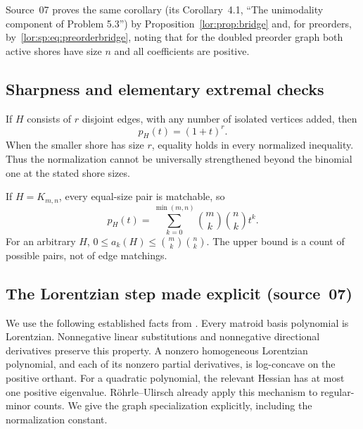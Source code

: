 \documentclass[11pt]{article}
\numberwithin{equation}{section}
\theoremstyle{definition}
\begin{document}
Source~07 proves the same corollary (its Corollary~4.1, ``The unimodality
component of Problem 5.3'') by Proposition~\ref{lor:prop:bridge} and, for
preorders, by~\eqref{lor:sp:eq:preorderbridge}, noting that for the doubled
preorder graph both active shores have size $n$ and all coefficients are
positive.
\subsection{Sharpness and elementary extremal checks}
If $H$ consists of $r$ disjoint edges, with any number of isolated vertices
added, then
\[
 p_H(t)=(1+t)^r.
\]
When the smaller shore has size $r$, equality holds in every normalized
inequality. Thus the normalization cannot be universally strengthened
beyond the binomial one at the stated shore sizes.

If $H=K_{m,n}$, every equal-size pair is matchable, so
\begin{equation}
 p_H(t)=\sum_{k=0}^{\min(m,n)}\binom m k\binom n k t^k.
 \label{lor:eq:completebip}
\end{equation}
For an arbitrary $H$,
$0\le a_k(H)\le\binom m k\binom n k$. The upper bound is a count of
possible pairs, not of edge matchings.


\subsection{The Lorentzian step made explicit (source~07)}
\label{lor:sec:sp:ulc}
We use the following established facts from \cite[Theorems 2.10, 2.30,
3.10]{BH}. Every matroid basis polynomial is Lorentzian. Nonnegative linear
substitutions and nonnegative directional derivatives preserve this property.
A nonzero homogeneous Lorentzian polynomial, and each of its nonzero partial
derivatives, is log-concave on the positive orthant. For a quadratic
polynomial, the relevant Hessian has at most one positive eigenvalue.
R\"ohrle--Ulirsch \cite[Theorem A]{RU} already apply this mechanism to
regular-minor counts. We give the graph specialization explicitly, including
the normalization constant.
\end{document}
